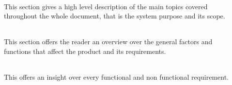 \begin{description}
  \item[] \hfill \\
  This section gives a high level description of the main topics covered throughout the whole document, that is the system purpose and its scope.
  \item[] \hfill \\
  This section offers the reader an overview over the general factors and functions that affect the product and its requirements.
  \item[] \hfill \\
  This offers an insight over every functional and non functional requirement.
\end{description}